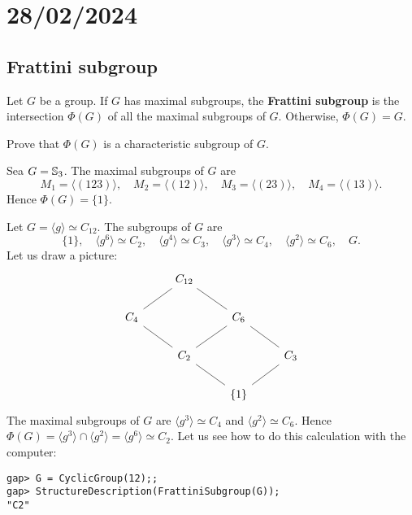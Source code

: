 \section{28/02/2024}

\subsection{Frattini subgroup}

\begin{definition}
Let $G$ be a group. If $G$ has maximal subgroups, 
the \textbf{Frattini subgroup} is the intersection 
$\Phi(G)$ of all the maximal subgroups of $G$. 
Otherwise, 
$\Phi(G)=G$. 
\end{definition}

\begin{exercise}
\label{xca:Phi(G)char}
Prove that $\Phi(G)$ is a characteristic subgroup of $G$. 
\end{exercise}

\begin{example}
Sea $G=\mathbb{S}_3$. The maximal subgroups of $G$ are 
\[
M_1=\langle (123)\rangle,
\quad
M_2=\langle (12)\rangle,
\quad
M_3=\langle (23)\rangle,
\quad
M_4=\langle (13)\rangle.
\]
Hence $\Phi(G)=\{1\}$. 
\end{example}

\begin{example}
Let $G=\langle g\rangle\simeq C_{12}$. The subgroups of $G$ are 
\[
\{1\},\quad
\langle g^6\rangle\simeq C_2,\quad
\langle g^4\rangle\simeq C_3,\quad
\langle g^3\rangle\simeq C_4,\quad
\langle g^2\rangle\simeq C_6,\quad
G.
\]
Let us draw a picture:
\[\begin{tikzcd}
	& {C_{12}} \\
	{C_4} && {C_6} \\
	& {C_2} && {C_3} \\
	&& {\{1\}}
	\arrow[no head, from=4-3, to=3-2]
	\arrow[no head, from=4-3, to=3-4]
	\arrow[no head, from=3-4, to=2-3]
	\arrow[no head, from=2-3, to=1-2]
	\arrow[no head, from=3-2, to=2-1]
	\arrow[no head, from=2-1, to=1-2]
	\arrow[no head, from=3-2, to=2-3]
\end{tikzcd}\]
The maximal subgroups of $G$ are 
$\langle g^3\rangle\simeq C_4$ and $\langle
g^2\rangle\simeq C_6$. Hence $\Phi(G)=\langle g^3\rangle\cap \langle
g^2\rangle=\langle g^6\rangle\simeq C_2$. 
Let us see how to do this calculation with the computer:
\begin{lstlisting}
gap> G = CyclicGroup(12);;
gap> StructureDescription(FrattiniSubgroup(G));
"C2"
\end{lstlisting} 
\end{example}


